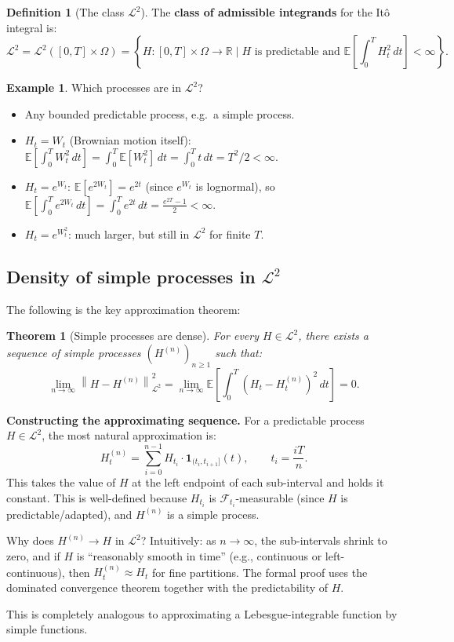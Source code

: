\documentclass[11pt,a4paper]{article}
\theoremstyle{definition}
\newtheorem{definition}{Definition}[section]
\newtheorem{example}{Example}[section]
\theoremstyle{plain}
\newtheorem{theorem}{Theorem}[section]
\theoremstyle{remark}
\newcommand{\R}{\mathbb{R}}
\newcommand{\E}{\mathbb{E}}
\newcommand{\F}{\mathcal{F}}
\newcommand{\calL}{\mathcal{L}}
\newcommand{\norm}[1]{\left\|#1\right\|}
\begin{document}
\begin{definition}[The class \texorpdfstring{$\calL^2$}{L2}]
\label{def:L2}
The \textbf{class of admissible integrands} for the Itô integral is:
\[
  \calL^2 = \calL^2([0,T]\times\Omega) = \left\{H : [0,T]\times\Omega\to\R \;\Big|\; H \text{ is predictable and } \E\left[\int_0^T H_t^2\,dt\right] < \infty\right\}.
\]
\end{definition}

\begin{example}
Which processes are in $\calL^2$?
\begin{itemize}
  \item Any bounded predictable process, e.g.\ a simple process.
  \item $H_t = W_t$ (Brownian motion itself): $\E[\int_0^T W_t^2\,dt] = \int_0^T \E[W_t^2]\,dt = \int_0^T t\,dt = T^2/2 < \infty$. \checkmark
  \item $H_t = e^{W_t}$: $\E[e^{2W_t}] = e^{2t}$ (since $e^{W_t}$ is lognormal), so $\E[\int_0^T e^{2W_t}\,dt] = \int_0^T e^{2t}\,dt = \frac{e^{2T}-1}{2} < \infty$. \checkmark
  \item $H_t = e^{W_t^2}$: much larger, but still in $\calL^2$ for finite $T$. \checkmark
\end{itemize}
\end{example}

\subsection{Density of simple processes in \texorpdfstring{$\calL^2$}{L2}}

The following is the key approximation theorem:

\begin{theorem}[Simple processes are dense]
\label{thm:density}
For every $H \in \calL^2$, there exists a sequence of simple processes $(H^{(n)})_{n \geq 1}$ such that:
\[
  \lim_{n\to\infty} \norm{H - H^{(n)}}_{\calL^2}^2 = \lim_{n\to\infty} \E\left[\int_0^T (H_t - H_t^{(n)})^2\,dt\right] = 0.
\]
\end{theorem}

\begin{tutobox}
\textbf{Constructing the approximating sequence.}
For a predictable process $H \in \calL^2$, the most natural approximation is:
\[
  H_t^{(n)} = \sum_{i=0}^{n-1} H_{t_i}\cdot\mathbf{1}_{(t_i,t_{i+1}]}(t), \qquad t_i = \frac{iT}{n}.
\]
This takes the value of $H$ at the left endpoint of each sub-interval and holds it constant. This is well-defined because $H_{t_i}$ is $\F_{t_i}$-measurable (since $H$ is predictable/adapted), and $H^{(n)}$ is a simple process.

Why does $H^{(n)} \to H$ in $\calL^2$? Intuitively: as $n \to \infty$, the sub-intervals shrink to zero, and if $H$ is ``reasonably smooth in time'' (e.g., continuous or left-continuous), then $H^{(n)}_t \approx H_t$ for fine partitions. The formal proof uses the dominated convergence theorem together with the predictability of $H$.

This is completely analogous to approximating a Lebesgue-integrable function by simple functions.
\end{tutobox}
\end{document}
